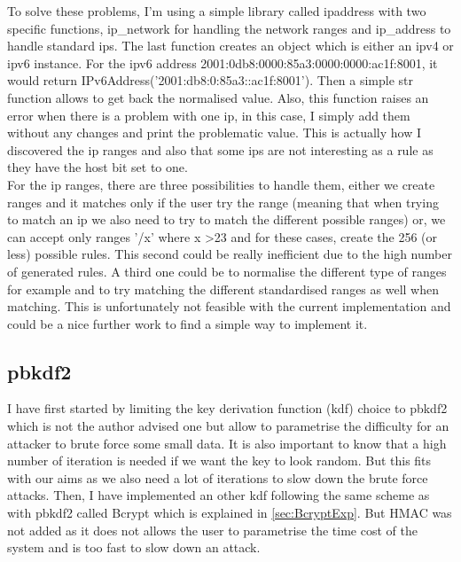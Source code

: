 \documentclass{eplmastersthesis}
\begin{document}
To solve these problems, I'm using a simple library called ipaddress with two specific functions, ip\_network for handling the network ranges and ip\_address to handle standard \gls{ip}s.
The last function creates an object which is either an \gls{ipv4} or \gls{ipv6} instance. For the \gls{ipv6} address 2001:0db8:0000:85a3:0000:0000:ac1f:8001, it would return IPv6Address('2001:db8:0:85a3::ac1f:8001'). Then a simple str function allows to get back the normalised value.
Also, this function raises  an error when there is a problem with one \gls{ip}, in this case, I simply add them without any changes and print the problematic value.
This is actually how I discovered the \gls{ip} ranges and also that some \gls{ip}s are not interesting as a rule as they have the host bit set to one.\\

For the \gls{ip} ranges, there are three possibilities to handle them, either we create ranges and it matches only if the user try the range (meaning that when trying to match an \gls{ip} we also need to try to match the different possible ranges) or, we can accept only ranges '/x' where x >23 and for these cases, create the 256 (or less) possible rules. This second could be really inefficient due to the high number of generated rules. A third one could be to normalise the different type of ranges for example and to try matching the different standardised ranges as well when matching. This is unfortunately not feasible with the current implementation and could be a nice further work to find a simple way to implement it.


\subsection{\gls{pbkdf2}}
I have first started by limiting the key derivation function (\gls{kdf}) choice to \gls{pbkdf2} which is not the author advised one but allow to parametrise the difficulty for an attacker to brute force some small data. It is also important to know that a high number of iteration is needed if we want the key to look random. But this fits with our aims as we also need a lot of iterations to slow down the brute force attacks.
Then, I have implemented an other \gls{kdf} following the same scheme as with \gls{pbkdf2} called Bcrypt which is explained in \ref{sec:BcryptExp}. 
But HMAC was not added as it does not allows the user to parametrise the time cost of the system and is too fast to slow down an attack.
\end{document}
